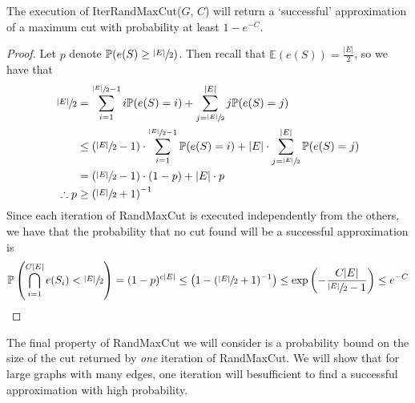 		\begin{claim}
			The execution of IterRandMaxCut($G$, $C$) will return a `successful' approximation of a maximum cut with 
			probability at least $1- e^{-C}$.
		\end{claim}
		\begin{proof}
			Let $p$ denote $\mathbb{P}(e(S) \geq \sfrac{|E|}{2})$. Then recall that $\mathbb{E}(e(S)) = \frac{|E|}{2}$, so
			we have that 
			\begin{align*}
				\sfrac{|E|}{2} &= \sum_{i=1}^{\sfrac{|E|}{2}-1} i \mathbb{P}(e(S) = i) + 
				               \sum_{j=\sfrac{|E|}{2}}^{|E|} j \mathbb{P}(e(S) = j) \\
					       &\leq (\sfrac{|E|}{2} - 1) \cdot \sum_{i=1}^{\sfrac{|E|}{2}-1} \mathbb{P}(e(S) = i) + 
				               |E| \cdot \sum_{j=\sfrac{|E|}{2}}^{|E|} \mathbb{P}(e(S) = j) \\
					       &= (\sfrac{|E|}{2} - 1) \cdot (1-p) + |E| \cdot p \\
				\therefore p &\geq \left(\sfrac{|E|}{2} +1 \right)^{-1}
			\end{align*}
			Since each iteration of RandMaxCut is executed independently from the others, we have that the probability that
			no cut found will be a successful approximation is 
			$$
				\mathbb{P}\left(\bigcap_{i = 1}^{C|E|}e(S_i) < \sfrac{|E|}{2}\right) = (1-p)^{c|E|} \leq 
				\left(1 - (\sfrac{|E|}{2} +1 )^{-1}\right) \leq \exp\left(-\frac{C|E|}{\sfrac{|E|}{2} - 1}\right)
				\leq e^{-C}
			$$
		\end{proof}
		
		The final property of RandMaxCut we will consider is a probability bound on the size of the cut returned by \emph{one}
		iteration of RandMaxCut. We will show that for large graphs with many edges, one iteration will besufficient
		to find a successful approximation with high probability. 

